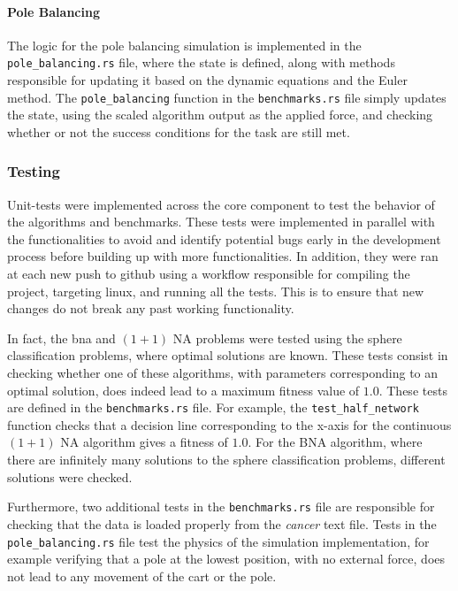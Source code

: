 \paragraph{Pole Balancing} The logic for the pole balancing simulation is implemented in the  \\ \texttt{pole\_balancing.rs} file, where the state is defined, along with methods
responsible for updating it based on the dynamic equations and the Euler method. The \texttt{pole\_balancing} function in the \texttt{benchmarks.rs} file simply
updates the state, using the scaled algorithm output as the applied force, and checking whether or not the success conditions for the task are still met.

\subsubsection{Testing}

Unit-tests were implemented across the core component to test the behavior of the algorithms and benchmarks.
These tests were implemented in parallel with the functionalities to avoid and identify potential bugs early in the development process before
building up with more functionalities. In addition, they were ran at each new push to github using a workflow responsible for compiling the project,
targeting linux, and running all the tests. This is to ensure that new changes do not break any past working functionality.

In fact, the bna and $(1 + 1)$ NA problems were tested using the sphere classification problems, where optimal solutions are known. These tests
consist in checking whether one of these algorithms, with parameters corresponding to an optimal solution, does indeed lead to a maximum fitness value
of $1.0$. These tests are defined in the \texttt{benchmarks.rs} file. For example, the \texttt{test\_half\_network} function checks that a decision line
corresponding to the x-axis for the continuous $(1 + 1)$ NA algorithm gives a fitness of $1.0$. For the BNA algorithm, where there are infinitely many
solutions to the sphere classification problems, different solutions were checked.

Furthermore, two additional tests in the \texttt{benchmarks.rs} file are responsible for checking that the data is loaded properly from the \textit{cancer}
text file. Tests in the \texttt{pole\_balancing.rs} file test the physics of the simulation implementation, for example verifying that a pole at the lowest
position, with no external force, does not lead to any movement of the cart or the pole.

